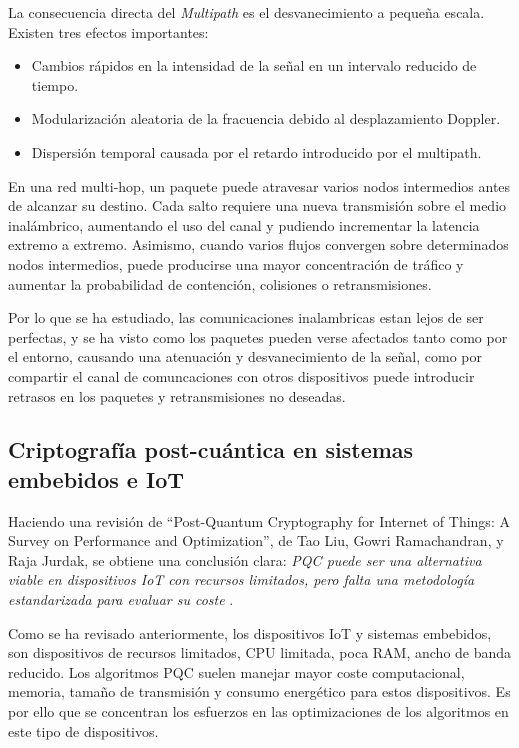     La consecuencia directa del \textit{Multipath} es el desvanecimiento a pequeña escala. Existen tres efectos importantes: 
    \begin{itemize}
        \item Cambios rápidos en la intensidad de la señal en un intervalo reducido de tiempo.
        \item Modularización aleatoria de la fracuencia debido al desplazamiento Doppler.
        \item Dispersión temporal causada por el retardo introducido por el multipath.
    \end{itemize}

    En una red multi-hop, un paquete puede atravesar varios nodos intermedios antes de alcanzar su destino. Cada salto requiere una nueva transmisión sobre el medio inalámbrico, aumentando 
    el uso del canal y pudiendo incrementar la latencia extremo a extremo. Asimismo, cuando varios flujos convergen sobre determinados nodos intermedios, puede producirse una mayor 
    concentración de tráfico y aumentar la probabilidad de contención, colisiones o retransmisiones.

    Por lo que se ha estudiado, las comunicaciones inalambricas estan lejos de ser perfectas, y se ha visto como los paquetes pueden verse afectados tanto como por el entorno, 
    causando una atenuación y desvanecimiento de la señal, como por compartir el canal de comuncaciones con otros dispositivos puede introducir retrasos en los paquetes y retransmisiones no deseadas. 


    \subsection{Criptografía post-cuántica en sistemas embebidos e IoT}
    
    Haciendo una revisión de ``Post-Quantum Cryptography for Internet of Things: A Survey on Performance and Optimization'', de Tao Liu, Gowri Ramachandran, y Raja Jurdak, 
    se obtiene una conclusión clara: \textit{PQC puede ser una alternativa viable en dispositivos IoT con recursos limitados, pero falta una metodología estandarizada para evaluar
    su coste} \cite{liu_post-quantum_2024}.

    Como se ha revisado anteriormente, los dispositivos IoT y sistemas embebidos, son dispositivos de recursos limitados, CPU limitada, poca RAM, ancho de banda reducido. Los algoritmos
    PQC suelen manejar mayor coste computacional, memoria, tamaño de transmisión y consumo energético para estos dispositivos. Es por ello que se concentran los esfuerzos en las optimizaciones 
    de los algoritmos en este tipo de dispositivos.

